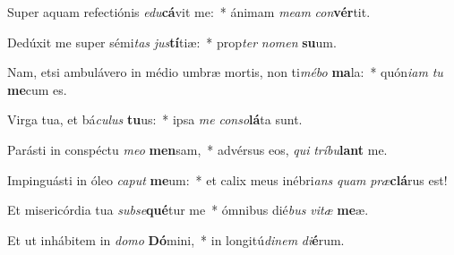 \item Super aquam refectiónis \textit{e}\textit{du}\textbf{cá}vit me:~* ánimam \textit{me}\textit{am} \textit{con}\textbf{vér}tit.
\item Dedúxit me super sémi\textit{tas} \textit{jus}\textbf{tí}tiæ:~* prop\textit{ter} \textit{no}\textit{men} \textbf{su}um.
\item Nam, etsi ambulávero in médio umbræ mortis, non ti\textit{mé}\textit{bo} \textbf{ma}la:~* quón\textit{i}\textit{am} \textit{tu} \textbf{me}cum es.
\item Virga tua, et bá\textit{cu}\textit{lus} \textbf{tu}us:~* ipsa \textit{me} \textit{con}\textit{so}\textbf{lá}ta sunt.
\item Parásti in conspéctu \textit{me}\textit{o} \textbf{men}sam,~* advérsus eos, \textit{qui} \textit{trí}\textit{bu}\textbf{lant} me.
\item Impinguásti in óleo \textit{ca}\textit{put} \textbf{me}um:~* et calix meus inébri\textit{ans} \textit{quam} \textit{præ}\textbf{clá}rus est!
\item Et misericórdia tua \textit{sub}\textit{se}\textbf{qué}tur me~* ómnibus dié\textit{bus} \textit{vi}\textit{tæ} \textbf{me}æ.
\item Et ut inhábitem in \textit{do}\textit{mo} \textbf{Dó}mini,~* in longitú\textit{di}\textit{nem} \textit{di}\textbf{é}rum.
